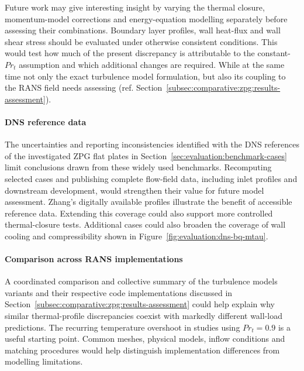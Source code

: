 Future work may give interesting insight by varying the thermal closure, momentum-model corrections and energy-equation modelling separately before assessing their combinations. Boundary layer profiles, wall heat-flux and wall shear stress should be evaluated under otherwise consistent conditions. This would test how much of the present discrepancy is attributable to the constant-\(Pr_t\) assumption and which additional changes are required. While at the same time not only the exact turbulence model formulation, but also its coupling to the RANS field needs assessing (ref. Section~\ref{subsec:comparative:zpg:results-assessment}).

\paragraph*{DNS reference data}
The uncertainties and reporting inconsistencies identified with the DNS references of the investigated ZPG flat plates in Section~\ref{sec:evaluation:benchmark-cases} limit conclusions drawn from these widely used benchmarks. Recomputing selected cases and publishing complete flow-field data, including inlet profiles and downstream development, would strengthen their value for future model assessment. Zhang's digitally available profiles illustrate the benefit of accessible reference data. Extending this coverage could also support more controlled thermal-closure tests. Additional cases could also broaden the coverage of wall cooling and compressibility shown in Figure~\ref{fig:evaluation:dns-bq-mtau}.

\paragraph*{Comparison across RANS implementations}
A coordinated comparison and collective summary of the turbulence models variants and their respective code implementations discussed in Section~\ref{subsec:comparative:zpg:results-assessment} could help explain why similar thermal-profile discrepancies coexist with markedly different wall-load predictions. The recurring temperature overshoot in studies using \(Pr_t=0.9\) is a useful starting point. Common meshes, physical models, inflow conditions and matching procedures would help distinguish implementation differences from modelling limitations.

